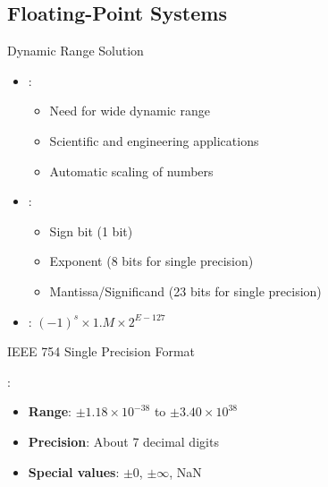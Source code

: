 \subsection{Floating-Point Systems}

\begin{frame}{Dynamic Range Solution}
\begin{itemize}
\item {}:
\begin{itemize}
\item Need for wide dynamic range
\item Scientific and engineering applications
\item Automatic scaling of numbers
\end{itemize}
\vspace{0.5cm}
\item {}:
\begin{itemize}
\item Sign bit (1 bit)
\item Exponent (8 bits for single precision)
\item Mantissa/Significand (23 bits for single precision)
\end{itemize}
\vspace{0.3cm}
\item {}: $(-1)^s \times 1.M \times 2^{E-127}$
\end{itemize}
\end{frame}

\begin{frame}{IEEE 754 Single Precision Format}
\begin{center}
\end{center}

\vspace{0.5cm}
:
\begin{itemize}
\item \textbf{Range}: $\pm 1.18 \times 10^{-38}$ to $\pm 3.40 \times 10^{38}$
\item \textbf{Precision}: About 7 decimal digits
\item \textbf{Special values}: $\pm 0$, $\pm \infty$, NaN
\end{itemize}
\end{frame}

